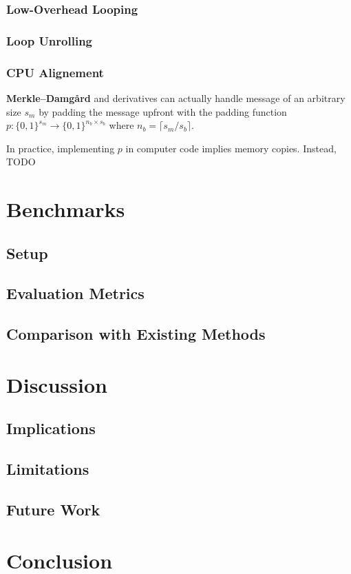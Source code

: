 \documentclass[11pt]{article}
\begin{document}
\subsubsection{Low-Overhead Looping}

\subsubsection{Loop Unrolling}

\subsubsection{CPU Alignement}

\textbf{Merkle–Damgård} and derivatives can actually handle message of an arbitrary size \( s_m \) by padding the message upfront with the padding function \( p: \{0,1\}^{s_m} \to \{0,1\}^{n_b \times s_b} \) where \( n_b = \lceil s_m/s_b \rceil \).

In practice, implementing \( p \) in computer code implies memory copies. Instead, TODO

\section{Benchmarks}
\subsection{Setup}
\subsection{Evaluation Metrics}
\subsection{Comparison with Existing Methods}

\section{Discussion}
\subsection{Implications}
\subsection{Limitations}
\subsection{Future Work}

\section{Conclusion}
\end{document}
